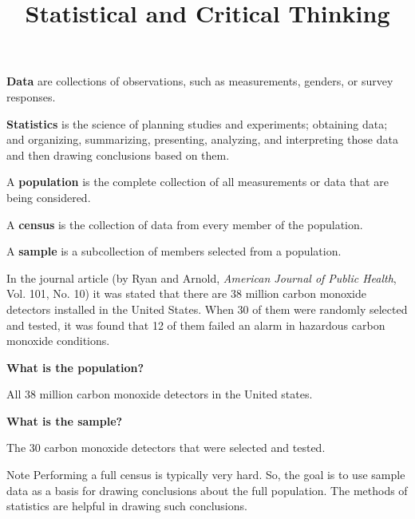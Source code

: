 \documentclass{beamer}
\title[MA205 - Section 1.1]{Statistical and Critical Thinking}
\begin{document}
\begin{frame}
\titlepage
\end{frame}

\begin{frame}
\begin{definition}
\textbf{Data} are collections of observations, such as measurements, genders, or survey responses.
\end{definition}\pause

\begin{definition}
\textbf{Statistics} is the science of planning studies and experiments; obtaining data; and organizing, summarizing, presenting, analyzing, and interpreting those data and then drawing conclusions based on them.
\end{definition}\pause

\begin{definition}
A \textbf{population} is the complete collection of all measurements or data that are being considered.
\end{definition}\pause

\begin{definition}
A \textbf{census} is the collection of data from every member of the population.
\end{definition}\pause

\begin{definition}
A \textbf{sample} is a subcollection of members selected from a population.
\end{definition}
\end{frame}

\begin{frame}
\begin{example}
In the journal article  (by Ryan and Arnold, \emph{American Journal of Public Health}, Vol. 101, No. 10) it was stated that there are 38 million carbon monoxide detectors installed in the United States. When 30 of them were randomly selected and tested, it was found that 12 of them failed an alarm in hazardous carbon monoxide conditions.

\vspace{5mm}
\textbf{What is the population?}\pause 

All 38 million carbon monoxide detectors in the United states. \pause

\vspace{5mm}
\textbf{What is the sample?}\pause 

The 30 carbon monoxide detectors that were selected and tested.
\end{example}\pause

\begin{block}{Note}
Performing a full census is typically very hard. So, the goal is to use sample data as a basis for drawing conclusions about the full population. The methods of statistics are helpful in drawing such conclusions.
\end{block}
\end{frame}
\end{document}
